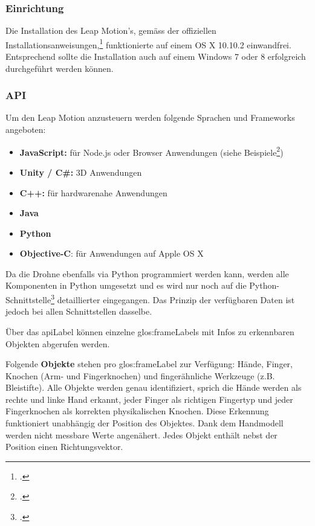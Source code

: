 \subsubsection{Einrichtung}
Die Installation des Leap Motion's, gemäss der offiziellen Installationsanweisungen,\footcite{Getting_Started_Leap_Motion_Developers_2015-03-28} funktionierte auf einem OS X 10.10.2 einwandfrei.
Entsprechend sollte  die Installation auch auf einem Windows 7 oder 8 erfolgreich durchgeführt werden können.

\subsubsection{API}
\label{subsec:leapmotion:api}
Um den Leap Motion anzusteuern werden folgende Sprachen und Frameworks angeboten:
\begin{itemize}
	\item \textbf{JavaScript:} für Node.js oder Browser Anwendungen (siehe Beispiele\footcite{Getting_Started_Leap_Motion_Developers_2015-03-28})
	\item \textbf{Unity / C\#:} 3D Anwendungen
	\item \textbf{C++:} für hardwarenahe Anwendungen
	\item \textbf{Java}
	\item \textbf{Python}
	\item \textbf{Objective-C}: für Anwendungen auf Apple OS X
\end{itemize}

Da die Drohne ebenfalls via Python programmiert werden kann, werden alle Komponenten in Python umgesetzt und es wird nur noch auf die Python-Schnittstelle\footcite{Python_SDK_Documentation__Leap_Motion_Python_SDK_v2.2_documentation_2015-03-28} detaillierter eingegangen. Das Prinzip der verfügbaren Daten ist jedoch bei allen Schnittstellen dasselbe.

Über das \gls{apiLabel} können einzelne \glspl{glos:frameLabel} mit Infos zu erkennbaren Objekten abgerufen werden.

Folgende \textbf{Objekte} stehen pro \gls{glos:frameLabel} zur Verfügung: Hände, Finger, Knochen (Arm- und Fingerknochen) und fingerähnliche Werkzeuge (z.B. Bleistifte).
Alle Objekte werden genau identifiziert, sprich die Hände werden als rechte und linke Hand erkannt, jeder Finger als richtigen Fingertyp und jeder Fingerknochen als korrekten physikalischen Knochen. Diese Erkennung funktioniert unabhängig der Position des Objektes. Dank dem Handmodell werden nicht messbare Werte angenähert.
Jedes Objekt enthält nebst der Position einen Richtungsvektor.

